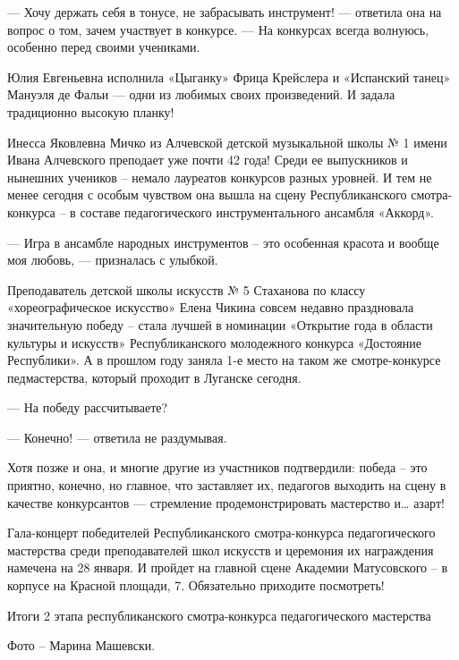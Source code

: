 
— Хочу держать себя в тонусе, не забрасывать инструмент! — ответила она на
вопрос о том, зачем участвует в конкурсе. — На конкурсах всегда волнуюсь,
особенно перед своими учениками.


Юлия Евгеньевна исполнила «Цыганку» Фрица Крейслера и «Испанский танец» Мануэля
де Фальи — одни из любимых своих произведений. И задала традиционно высокую
планку!

Инесса Яковлевна Мичко из Алчевской детской музыкальной школы № 1 имени Ивана
Алчевского преподает уже почти 42 года! Среди ее выпускников и нынешних
учеников – немало лауреатов конкурсов разных уровней. И тем не менее сегодня с
особым чувством она вышла на сцену Республиканского смотра-конкурса – в составе
педагогического инструментального ансамбля «Аккорд».

— Игра в ансамбле народных инструментов – это особенная красота и вообще моя
любовь, — призналась с улыбкой.

Преподаватель детской школы искусств № 5 Стаханова по классу «хореографическое
искусство» Елена Чикина совсем недавно праздновала значительную победу – стала
лучшей в номинации «Открытие года в области культуры и искусств»
Республиканского молодежного конкурса «Достояние Республики». А в прошлом году
заняла 1-е место на таком же смотре-конкурсе педмастерства, который проходит в
Луганске сегодня.

— На победу рассчитываете?

— Конечно! — ответила не раздумывая.

Хотя позже и она, и многие другие из участников подтвердили: победа – это
приятно, конечно, но главное, что заставляет их, педагогов выходить на сцену в
качестве конкурсантов — стремление продемонстрировать мастерство и… азарт!

Гала-концерт победителей Республиканского смотра-конкурса педагогического
мастерства среди преподавателей школ искусств и церемония их награждения
намечена на 28 января. И пройдет на главной сцене Академии Матусовского – в
корпусе на Красной площади, 7. Обязательно приходите посмотреть!

Итоги 2 этапа республиканского смотра-конкурса педагогического мастерства

Фото – Марина Машевски.

